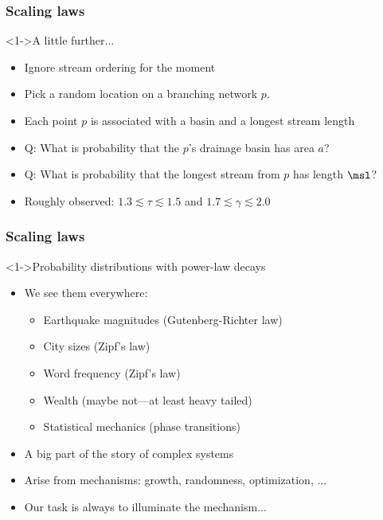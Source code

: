 \begin{frame}[label=]
  \frametitle{Scaling laws}

  \begin{block}<1->{A little further...}
    \begin{itemize}
    \item<2-> Ignore stream ordering for the moment
    \item<3-> Pick a random location on a branching network $p$.
    \item<4-> Each point $p$ is associated with a basin and a longest stream length
    \item<5-> \alert{Q:} What is probability that the $p$'s drainage basin
      has area $a$?
    \item<6-> \alert{Q:} What is probability that the longest stream from
      $p$ has length $\msl$?
    \item<9->
      Roughly observed: $1.3 \lesssim \tau \lesssim 1.5$
      and  $1.7 \lesssim \gamma \lesssim 2.0$
    \end{itemize}
  \end{block}
  
\end{frame}

\begin{frame}[label=]
  \frametitle{Scaling laws}

  \begin{block}<1->{Probability distributions with power-law decays}
    \begin{itemize}
    \item<2-> We see them everywhere:
      \begin{itemize}
      \item<3-> Earthquake magnitudes (Gutenberg-Richter law)
      \item<4-> City sizes (Zipf's law)
      \item<5-> Word frequency (Zipf's law)\cite{zipf1949a}
      \item<6-> Wealth (maybe not---at least heavy tailed)
      \item<7-> Statistical mechanics (phase transitions)\cite{goldenfeld1992a}
      \end{itemize}
    \item<8-> A big part of the story of complex systems
    \item<9-> Arise from \alert{mechanisms}: growth, randomness, optimization, ...
    \item<10-> Our task is always to illuminate the mechanism...
    \end{itemize}
  \end{block}
\end{frame}

